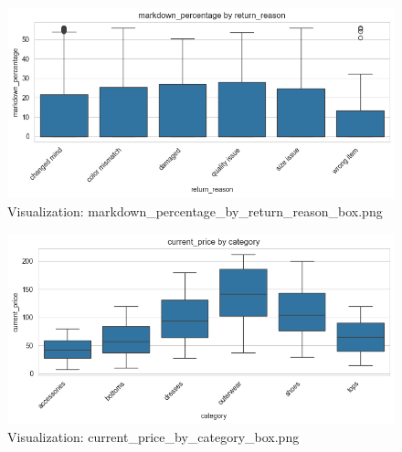 \documentclass{article}%
\begin{document}
\begin{minipage}[c]{0.48\textwidth}%


\begin{figure}[H]%
\centering%
\includegraphics[width=\linewidth]{output/plots/markdown_percentage_by_return_reason_box.png}%
\caption{Visualization: markdown\_percentage\_by\_return\_reason\_box.png}%
\end{figure}

%
\end{minipage}%
\begin{minipage}[c]{0.48\textwidth}%


\begin{figure}[H]%
\centering%
\includegraphics[width=\linewidth]{output/plots/current_price_by_category_box.png}%
\caption{Visualization: current\_price\_by\_category\_box.png}%
\end{figure}

%
\end{minipage}%
\vspace{10pt}%
\\%
\end{document}
